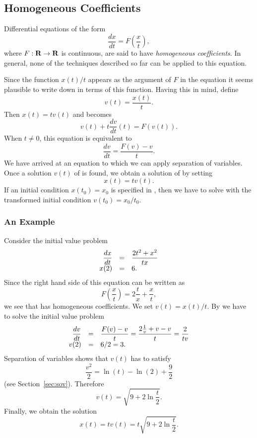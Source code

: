 \documentclass{ximera}
\begin{document}
\subsection*{Homogeneous Coefficients}

Differential equations of the form
\begin{equation}
\label{eq:homcoeff}
\frac{dx}{dt} = F\left(\frac{x}{t}\right),
\end{equation}
where $F:\mbox{$\bf{R}$}\to\mbox{$\bf{R}$}$ is continuous, are said to have {\em
homogeneous coefficients}.  
In general, none of the techniques
described so far can be applied to this equation.  

Since the function $x(t)/t$ appears as the argument of $F$ in
the equation it seems plausible to write down 
in terms of this function.  Having this in mind, define
\[
v(t) = \frac{x(t)}{t}.
\]
Then $x(t) = t v(t)$ and  becomes
\[
v(t) + t \frac{dv}{dt}(t) = F(v(t)).
\]
When $t\not= 0$, this equation is equivalent to
\begin{equation}
\label{eq:homsep}
\frac{dv}{dt} = \frac{F(v)-v}{t}.
\end{equation}
We have arrived at an equation to which we can apply separation
of variables.  
Once a solution $v(t)$ of  is
found, we obtain a solution of  by setting
\[
x(t) = t v(t).
\]
If an initial condition $x(t_0)=x_0$ is specified in
, then we have to solve  with
the transformed initial condition $v(t_0)=x_0/t_0$.

\subsubsection*{An Example}
Consider the initial value problem
\begin{equation}
\label{eq:homcoex1}
\begin{array}{rcl}
\displaystyle \frac{dx}{dt} & = & \displaystyle \frac{2t^2+x^2}{tx} \\
x(2) & = & 6.
\end{array}
\end{equation}
{\rm Since the right hand side of this equation can be written as
\[
F\left(\frac{x}{t}\right) = 2\frac{t}{x}+\frac{x}{t},
\]
we see that  has homogeneous 
coefficients.  We
set $v(t) = x(t)/t$. By  we have to solve the
initial value problem
\[
\begin{array}{rcl}
\displaystyle \frac{dv}{dt} & = & \displaystyle \frac{F(v)-v}{t} = 
\frac{2\frac{1}{v}+v-v}{t}=\frac{2}{tv} \\
v(2) & = & 6/2 = 3.
\end{array}
\]
Separation of variables  shows that 
$v(t)$ has to satisfy
\[
\frac{v^2}{2} = \ln(t) - \ln(2) + \frac{9}{2}
\]
(see Section~\ref{sec:sov}). Therefore
\[
v(t) = \sqrt{9+2\ln\frac{t}{2}}.
\]
Finally, we obtain the solution
\[
x(t) = tv(t) = t\sqrt{9+2\ln\frac{t}{2}}.
\]}
\end{document}
